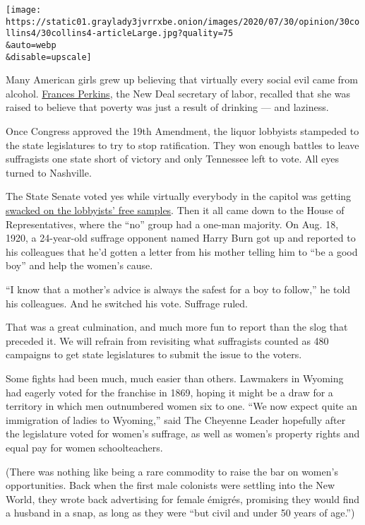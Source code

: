 \texttt{[image: https://static01.graylady3jvrrxbe.onion/images/2020/07/30/opinion/30collins4/30collins4-articleLarge.jpg?quality=75\\\&auto=webp\\\&disable=upscale]}

Many American girls grew up believing that virtually every social evil
came from alcohol.
\href{https://francesperkinscenter.org/life-new/}{Frances Perkins}, the
New Deal secretary of labor, recalled that she was raised to believe
that poverty was just a result of drinking --- and laziness.

Once Congress approved the 19th Amendment, the liquor lobbyists
stampeded to the state legislatures to try to stop ratification. They
won enough battles to leave suffragists one state short of victory and
only Tennessee left to vote. All eyes turned to Nashville.

The State Senate voted yes while virtually everybody in the capitol was
getting
\href{https://www.nytimes3xbfgragh.onion/2018/03/05/opinion/women-votes-feminism-alcohol.html}{swacked
on the lobbyists' free samples}. Then it all came down to the House of
Representatives, where the ``no'' group had a one-man majority. On Aug.
18, 1920, a 24-year-old suffrage opponent named Harry Burn got up and
reported to his colleagues that he'd gotten a letter from his mother
telling him to ``be a good boy'' and help the women's cause.

``I know that a mother's advice is always the safest for a boy to
follow,'' he told his colleagues. And he switched his vote. Suffrage
ruled.

That was a great culmination, and much more fun to report than the slog
that preceded it. We will refrain from revisiting what suffragists
counted as 480 campaigns to get state legislatures to submit the issue
to the voters.

Some fights had been much, much easier than others. Lawmakers in Wyoming
had eagerly voted for the franchise in 1869, hoping it might be a draw
for a territory in which men outnumbered women six to one. ``We now
expect quite an immigration of ladies to Wyoming,'' said The Cheyenne
Leader hopefully after the legislature voted for women's suffrage, as
well as women's property rights and equal pay for women schoolteachers.

(There was nothing like being a rare commodity to raise the bar on
women's opportunities. Back when the first male colonists were settling
into the New World, they wrote back advertising for female émigrés,
promising they would find a husband in a snap, as long as they were
``but civil and under 50 years of age.'')

